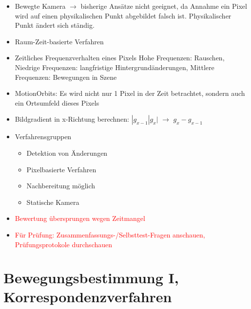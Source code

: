 \documentclass{report}
\begin{document}
\begin{itemize}
		\item Bewegte Kamera $\rightarrow$ bisherige Ansätze nicht geeignet, da Annahme ein Pixel wird auf einen physikalischen Punkt abgebildet falsch ist. Physikalischer Punkt ändert sich ständig.
		
		\item Raum-Zeit-basierte Verfahren
		\item Zeitliches Frequenzverhalten eines Pixels
		\newline Hohe Frequenzen: Rauschen, Niedrige Frequenzen: langfristige Hintergrundänderungen, Mittlere Frequenzen: Bewegungen in Szene
		\item MotionOrbits: Es wird nicht nur 1 Pixel in der Zeit betrachtet, sondern auch ein Ortsumfeld dieses Pixels
		
		\item Bildgradient in x-Richtung berechnen: $|g_{x-1}|g_x|$ $\rightarrow$ $g_x - g_{x-1}$
		
		\item Verfahrensgruppen
		\begin{itemize}
			\item Detektion von Änderungen
			\item Pixelbasierte Verfahren
			\item Nachbereitung möglich
			\item Statische Kamera
		\end{itemize}
	
		\item \textcolor{red}{Bewertung übersprungen wegen Zeitmangel}
		\item \textcolor{red}{Für Prüfung: Zusammenfassungs-/Selbsttest-Fragen anschauen, Prüfungsprotokole durchschauen}
		
	\end{itemize}
	\newpage
	
	\section{Bewegungsbestimmung I, Korrespondenzverfahren}
	
\end{document}
